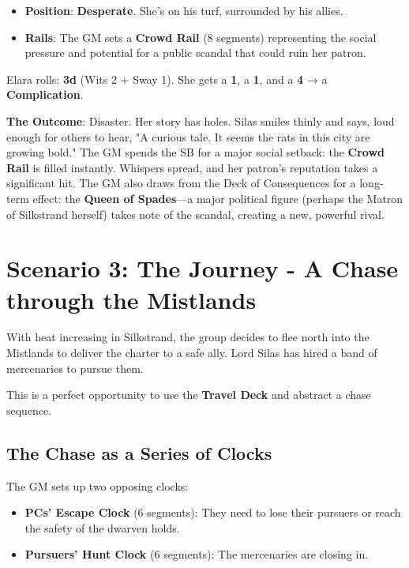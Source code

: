 \begin{itemize}
    \item \textbf{Position}: \textbf{Desperate}. She's on his turf, surrounded by his allies.
    \item \textbf{Rails}: The GM sets a \textbf{Crowd Rail} (8 segments) representing the social pressure and potential for a public scandal that could ruin her patron.
\end{itemize}

Elara rolls: \textbf{3d} (Wits 2 + Sway 1). She gets a \textbf{1}, a \textbf{1}, and a \textbf{4} → a \textbf{Complication}.

\textbf{The Outcome}: Disaster. Her story has holes. Silas smiles thinly and says, loud enough for others to hear, "A curious tale. It seems the rats in this city are growing bold." The GM spends the SB for a major social setback: the \textbf{Crowd Rail} is filled instantly. Whispers spread, and her patron's reputation takes a significant hit. The GM also draws from the Deck of Consequences for a long-term effect: the \textbf{Queen of Spades}—a major political figure (perhaps the Matron of Silkstrand herself) takes note of the scandal, creating a new, powerful rival.

\section*{Scenario 3: The Journey - A Chase through the Mistlands}

With heat increasing in Silkstrand, the group decides to flee north into the Mistlands to deliver the charter to a safe ally. Lord Silas has hired a band of mercenaries to pursue them.

This is a perfect opportunity to use the \textbf{Travel Deck} and abstract a chase sequence.

\subsection*{The Chase as a Series of Clocks}

The GM sets up two opposing clocks:
\begin{itemize}
    \item \textbf{PCs' Escape Clock} (6 segments): They need to lose their pursuers or reach the safety of the dwarven holds.
    \item \textbf{Pursuers' Hunt Clock} (6 segments): The mercenaries are closing in.
\end{itemize}

